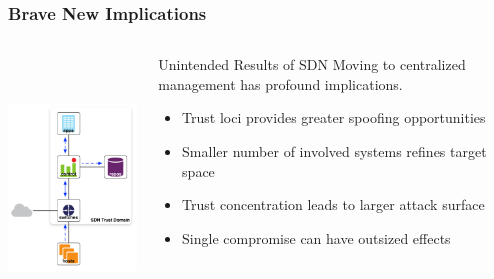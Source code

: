 \documentclass[t,handout]{beamer}
\begin{document}
\begin{frame}
\frametitle{Brave New Implications}
\begin{columns}[T]
\includegraphics[height=2.75in]{reference-model}
\begin{beamerboxesrounded}[shadow]{Unintended Results of SDN}
Moving to centralized management has profound implications.
\begin{itemize}
\item Trust loci provides greater spoofing opportunities
\item Smaller number of involved systems refines target space
\item Trust concentration leads to larger attack surface
\item Single compromise can have outsized effects
\end{itemize}
\end{beamerboxesrounded}
\end{columns}
\end{frame}

\end{document}
